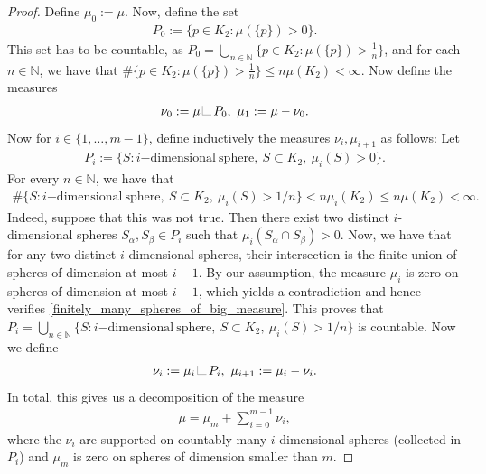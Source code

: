 \documentclass[10pt,a4paper]{amsart}
\newcommand{\LL}{{\mathchoice
{\,\LM7\,}{\,\LM7\,}{\,\LM5\,}{\,\LM{3.35}\,}}}
\newcommand{\LM}[1]{\hbox{\vrule width.2pt \vbox to#1pt{\vfill \hrule
width#1pt height.2pt}}}
\newcommand{\N}{\mathbb{N}}
\begin{document}
\begin{proof}
    Define $\mu_0:= \mu$. 
    Now, define the set 
    \begin{align*}
        P_0:= \{p \in K_2: \mu(\{p\})>0\}. 
    \end{align*}
    This set has to be countable, as $P_0 = \bigcup_{n \in \N} \{p \in K_2: \mu(\{p\})>\frac{1}{n}\}$, and for each $n\in \N$, we have that $\#\{p \in K_2: \mu(\{p\})>\frac{1}{n}\}\leq n\mu(K_2) <\infty$. 
    Now define the measures
    \begin{align}
        \nu_0:= \mu \LL P_0,\ \mu_1:= \mu-\nu_0.  
    \end{align}
    Now for $i \in \{1, \ldots, m-1\}$, define inductively the measures $\nu_i, \mu_{i+1}$ as follows:
    Let
    \begin{align}
        P_i:=\{S:  i\mathrm{-dimensional\ sphere}, \ S \subset K_2,\ \mu_i(S)>0\}. 
    \end{align}
    For every $n \in \N$, we have that 
    \begin{align}\label{finitely_many_spheres_of_big_measure}
       \#\{S:  i\mathrm{-dimensional\ sphere}, \ S \subset K_2,\ \mu_i(S)>1/n\} < n\mu_{i}(K_2) \leq n \mu(K_2) < \infty.
    \end{align}
    Indeed, suppose that this was not true. Then there exist two distinct $i$-dimensional spheres $S_\alpha, S_\beta \in P_i$ such that $\mu_{i}( S_\alpha \cap S_\beta) >0$. 
    Now, we have that for any two distinct $i$-dimensional spheres, their intersection is the finite union of spheres of dimension at most $i-1$. By our assumption, the measure $\mu_{i}$ is zero on spheres of dimension at most $i-1$, which yields a contradiction and hence verifies \eqref{finitely_many_spheres_of_big_measure}.
    This proves that $P_i = \bigcup_{n \in \N} \{S:  i\mathrm{-dimensional\ sphere}, \ S \subset K_2,\ \mu_i(S)>1/n\}$ is countable. 
    Now we define 
    \begin{align}
        \nu_i:= \mu_i \LL P_i,\ \mu_{i+1}:= \mu_i-\nu_{i}. 
    \end{align}
    In total, this gives us a decomposition of the measure 
    \begin{align}
        \mu = \mu_m + \sum_{i=0}^{m-1} \nu_{i},
    \end{align}
    where the $\nu_i$ are supported on countably many $i$-dimensional spheres (collected in $P_i$) and $\mu_m$ is zero on spheres of dimension smaller than $m$. 


\end{proof}
\end{document}
